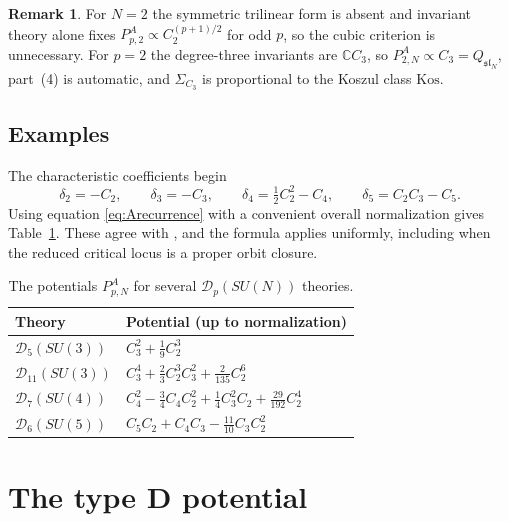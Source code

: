 \documentclass[10pt,reqno]{amsart}
\numberwithin{equation}{section}
\theoremstyle{plain}
\theoremstyle{definition}
\newtheorem{remark}[theorem]{Remark}
\newcommand{\Kos}{\mathrm{Kos}}
\begin{document}
\begin{remark}\label{rem:A-small}
For $N=2$ the symmetric trilinear form is absent and invariant theory alone fixes $P^A_{p,2}\propto C_2^{(p+1)/2}$ for odd $p$, so the cubic criterion is unnecessary. For $p=2$ the degree-three invariants are $\mathbb{C} C_3$, so $P^A_{2,N}\propto C_3=Q_{\mathfrak{sl}_N}$, part~(4) is automatic, and $\Sigma_{C_3}$ is proportional to the Koszul class $\Kos$.
\end{remark}

\subsection{Examples}

The characteristic coefficients begin
\begin{equation*}
	\delta_2=-C_2,\qquad \delta_3=-C_3,\qquad \delta_4=\tfrac12C_2^2-C_4,\qquad \delta_5=C_2C_3-C_5 .
\end{equation*}
Using equation \eqref{eq:Arecurrence} with a convenient overall normalization gives Table~\ref{tab:typeA}. These agree with \cite{KLSnonpoint}, and the formula applies uniformly, including when the reduced critical locus is a proper orbit closure.

\begin{table}[H]
\centering
\renewcommand{\arraystretch}{1.3}
\begin{tabular}{@{\phantom{T}}ll@{\phantom{T}}}
	\toprule
	Theory & Potential (up to normalization)\\\midrule
	$\mathcal{D}_5(SU(3))$ & $C_3^2+\frac19C_2^3$\\
	$\mathcal{D}_{11}(SU(3))$ & $C_3^4+\frac23C_2^3C_3^2+\frac2{135}C_2^6$\\
	$\mathcal{D}_7(SU(4))$ & $C_4^2-\frac34C_4C_2^2+\frac14C_3^2C_2+\frac{29}{192}C_2^4$\\
	$\mathcal{D}_6(SU(5))$ & $C_5C_2+C_4C_3-\frac{11}{10}C_3C_2^2$\\\bottomrule
\end{tabular}
\caption{The potentials $P^A_{p,N}$ for several $\mathcal{D}_p(SU(N))$ theories.}
\label{tab:typeA}
\end{table}


\section{The type D potential}\label{sec:typeD}
\end{document}
